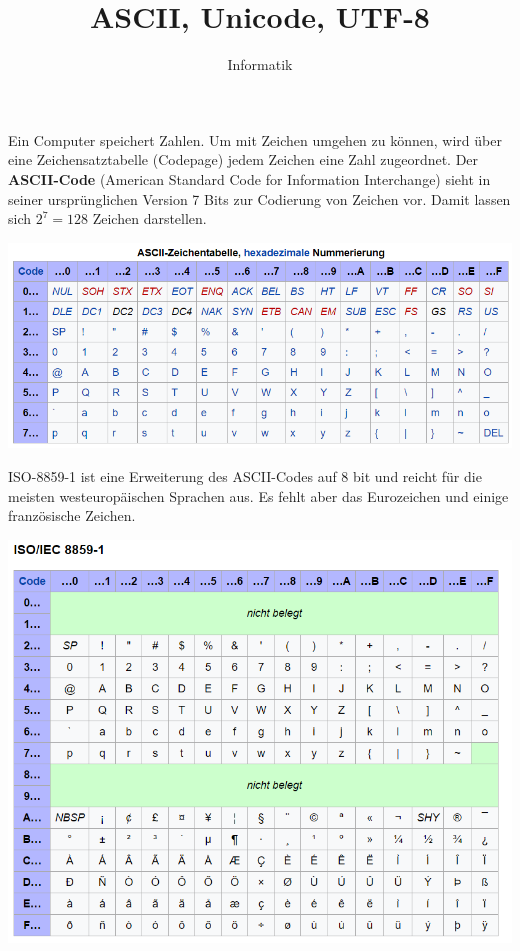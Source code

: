\documentclass[10pt]{beamer}
\begin{document}
\title{ASCII, Unicode, UTF-8}   
\author{Informatik} 
\date{ } 

\frame{\titlepage} 

\begin{frame}[fragile]
Ein Computer speichert Zahlen. Um mit Zeichen umgehen zu können, wird über
eine Zeichensatztabelle (Codepage) jedem Zeichen eine Zahl zugeordnet.
Der \textbf{ASCII-Code} (American Standard Code for Information Interchange) sieht in seiner ursprünglichen Version 7 Bits zur Codierung von Zeichen vor. Damit lassen sich $2^7 = 128$ Zeichen darstellen.  

\includegraphics[scale=0.6]{bild3.png} 

\end{frame}

\begin{frame}[fragile]
ISO-8859-1 ist eine Erweiterung des ASCII-Codes auf 8 bit und reicht für die meisten westeuropäischen Sprachen aus. Es fehlt aber das Eurozeichen und einige französische Zeichen.

\includegraphics[scale=0.5]{bild1.png}

\end{frame}
\end{document}
